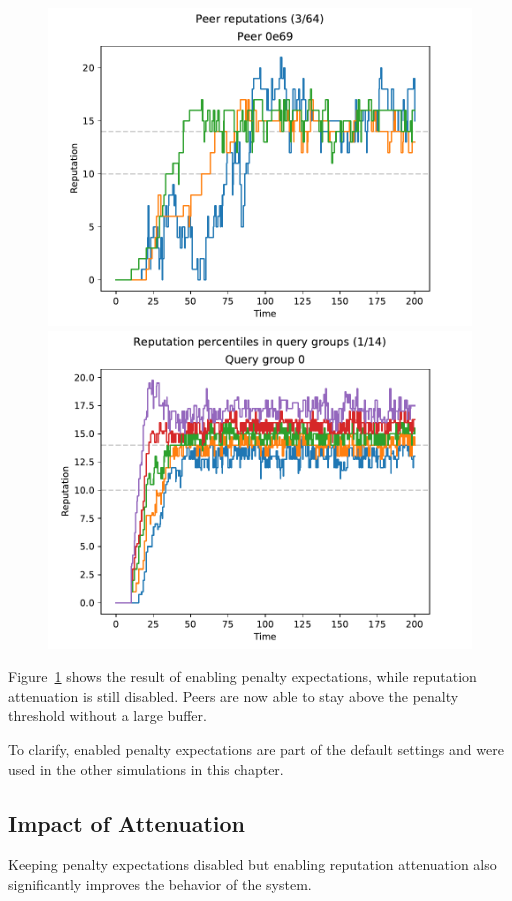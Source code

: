 \begin{figure}[t]
\centering
\includegraphics[width=0.5\columnwidth]{figures/expectations_on_no_att_peer_reps_3_of_64}%
\includegraphics[width=0.5\columnwidth]{figures/expectations_on_no_att_rep_percs_1_of_14}
\label{fig:penalty_expectations_on_no_att_peer_reps_percs}
\end{figure}

Figure~\ref{fig:penalty_expectations_on_no_att_peer_reps_percs} shows the result
of enabling penalty expectations, while reputation attenuation is still
disabled. Peers are now able to stay above the penalty threshold without a large
buffer.

To clarify, enabled penalty expectations are part of the default settings and
were used in the other simulations in this chapter.

\subsection{Impact of Attenuation}
Keeping penalty expectations disabled but enabling reputation attenuation also
significantly improves the behavior of the system.

